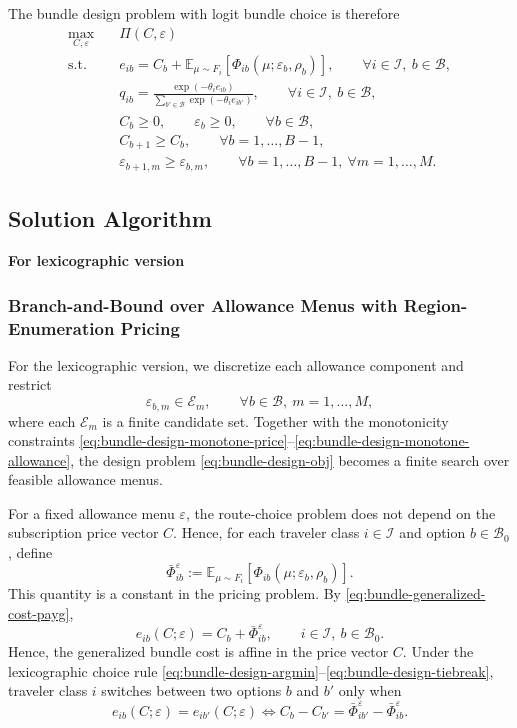 \documentclass{article}
\newcommand{\setB}{\mathcal{B}}
\newcommand{\setI}{\mathcal{I}}
\begin{document}
{The bundle design problem with logit bundle choice is therefore
\begin{align}
\max_{C,\varepsilon}\quad
& \Pi(C,\varepsilon)
\label{eq:bundle-design-problem-obj}
\\
\text{s.t.}\quad
& e_{ib}
=
C_b+
\mathbb E_{\mu\sim F_i}\!\left[\Phi_{ib}(\mu;\varepsilon_b,\rho_b)\right],
\qquad \forall i\in\setI,\ b\in\setB,
\label{eq:Bundle-design-link-1}
\\
& q_{ib}
=
\frac{\exp(-\theta_i e_{ib})}
{\sum_{b'\in\setB}\exp(-\theta_i e_{ib'})},
\qquad \forall i\in\setI,\ b\in\setB,
\label{eq:Bundle-design-link-2}
\\
& C_b\ge 0,\qquad \varepsilon_b\ge 0,
\qquad \forall b\in\setB,
\label{eq:Bundle-design-feasibility}
\\
& C_{b+1}\ge C_b,
\qquad \forall b=1,\dots,B-1,
\label{eq:Bundle-design-monotone-price}
\\
& \varepsilon_{b+1,m}\ge \varepsilon_{b,m},
\qquad \forall b=1,\dots,B-1,\ \forall m=1,\dots,M.
\label{eq:Bundle-design-monotone-allowance}
\end{align}
}
\subsection{Solution Algorithm}
\textbf{For lexicographic version}
\subsubsection{Branch-and-Bound over Allowance Menus with Region-Enumeration Pricing}

For the lexicographic version, we discretize each allowance component and restrict
\[
\varepsilon_{b,m}\in\mathcal E_m,\qquad \forall b\in\setB,\ m=1,\dots,M,
\]
where each $\mathcal E_m$ is a finite candidate set. Together with the monotonicity constraints
\eqref{eq:bundle-design-monotone-price}--\eqref{eq:bundle-design-monotone-allowance},
the design problem \eqref{eq:bundle-design-obj} becomes a finite search over feasible
allowance menus.

For a fixed allowance menu \(\varepsilon\), the route-choice problem does not
depend on the subscription price vector \(C\). Hence, for each traveler class
\(i\in\setI\) and option \(b\in\setB_0\), define
\[
\bar\Phi_{ib}^{\varepsilon}
:=
\mathbb E_{\mu\sim F_i}
\!\left[\Phi_{ib}(\mu;\varepsilon_b,\rho_b)\right].
\]
This quantity is a constant in the pricing problem. By
\eqref{eq:bundle-generalized-cost-payg},
\[
e_{ib}(C;\varepsilon)
=
C_b+\bar\Phi_{ib}^{\varepsilon},
\qquad i\in\setI,\ b\in\setB_0 .
\]
Hence, the generalized bundle cost is affine in the price vector \(C\).
Under the lexicographic choice rule
\eqref{eq:bundle-design-argmin}--\eqref{eq:bundle-design-tiebreak},
traveler class \(i\) switches between two options \(b\) and \(b'\) only when
\[
e_{ib}(C;\varepsilon)=e_{ib'}(C;\varepsilon)
\iff
C_b-C_{b'}
=
\bar\Phi_{ib'}^{\varepsilon}
-
\bar\Phi_{ib}^{\varepsilon}.
\]
\end{document}
